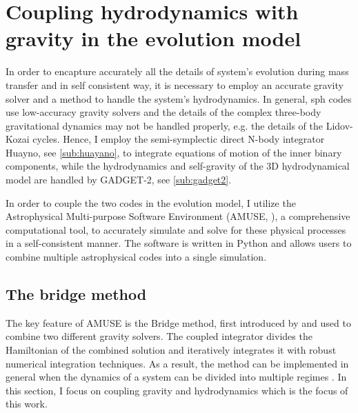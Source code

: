 \section{Coupling hydrodynamics with gravity in the evolution model}

In order to encapture accurately all the details of system's evolution during mass transfer and in self consistent way, it is necessary to employ an accurate gravity solver and a method to handle the system's hydrodynamics. In general, \ac{sph} codes use low-accuracy gravity solvers and the details of the complex three-body gravitational dynamics may not be handled properly, e.g. the details of the Lidov-Kozai cycles. Hence, I employ the semi-symplectic direct N-body integrator Huayno, see \cref{sub:huayano}, to integrate equations of motion of the inner binary components, while the hydrodynamics and self-gravity of the 3D hydrodynamical model are handled by GADGET-2, see \cref{sub:gadget2}. 

In order to couple the two codes in the evolution model, I utilize the Astrophysical Multi-purpose Software Environment (AMUSE, \cite{pelupessy2013astrophysical,portegies2018astrophysical}), a comprehensive computational tool, to accurately simulate and solve for these physical processes in a self-consistent manner.  The software is written in Python and allows users to combine multiple astrophysical codes into a single simulation. 

\subsection{The bridge method}

The key feature of AMUSE is the Bridge method, first introduced by \cite{fujii2007bridge} and used to combine two different gravity solvers. The coupled integrator divides the Hamiltonian of the combined solution and iteratively integrates it with robust numerical integration techniques. As a result, the method can be implemented in general when the dynamics of a system can be divided into multiple regimes \citep{zwart2013multi}. In this section, I focus on coupling gravity and hydrodynamics which is the focus of this work.

